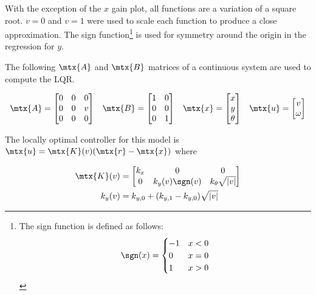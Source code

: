 With the exception of the $x$ gain plot, all functions are a variation of a
square root. $v = 0$ and $v = 1$ were used to scale each function to produce a
close approximation. The sign function\footnote{The sign function is defined as
follows:
\begin{equation*}
  \sgn(x) = \begin{cases}
    -1 & x < 0 \\
    0 & x = 0 \\
    1 & x > 0
  \end{cases}
\end{equation*}} is used for symmetry around the origin in the regression for
$y$.
\begin{theorem}
  The following $\mtx{A}$ and $\mtx{B}$ matrices of a continuous system are used
  to compute the LQR.

  \begin{equation}
    \begin{array}{llll}
      \mtx{A} =
      \begin{bmatrix}
        0 & 0 & 0 \\
        0 & 0 & v \\
        0 & 0 & 0
      \end{bmatrix} &
      \mtx{B} =
      \begin{bmatrix}
        1 & 0 \\
        0 & 0 \\
        0 & 1
      \end{bmatrix} &
      \mtx{x} = \begin{bmatrix}x \\ y \\ \theta\end{bmatrix} &
      \mtx{u} = \begin{bmatrix}v \\ \omega\end{bmatrix}
    \end{array}
  \end{equation}

  The locally optimal controller for this model is
  $\mtx{u} = \mtx{K}(v) (\mtx{r} - \mtx{x})$ where

  \begin{align}
    \mtx{K}(v) &= \begin{bmatrix}
      k_x & 0 & 0 \\
      0 & k_y(v) \sgn(v) & k_{\theta} \sqrt{|v|}
    \end{bmatrix} \\
    k_y(v) &= k_{y, 0} + (k_{y, 1} - k_{y, 0}) \sqrt{|v|}
  \end{align}


\end{theorem}
